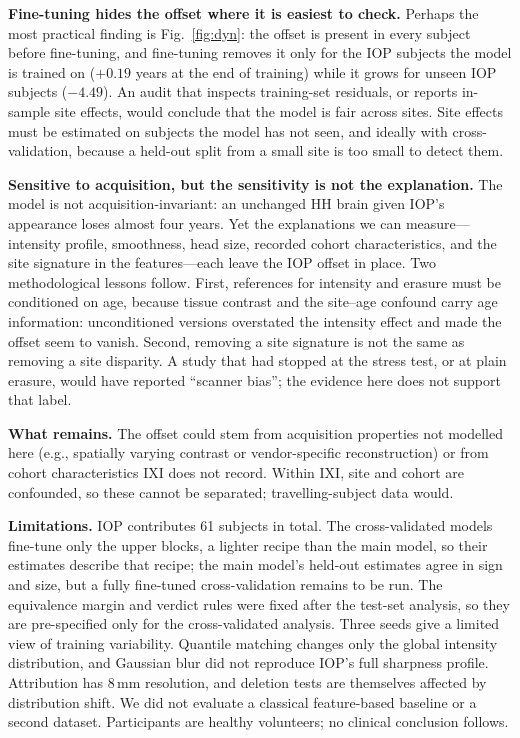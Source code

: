 \documentclass[conference]{IEEEtran}
\begin{document}
\textbf{Fine-tuning hides the offset where it is easiest to check.} Perhaps the most practical finding is Fig.~\ref{fig:dyn}: the offset is present in every subject before fine-tuning, and fine-tuning removes it only for the IOP subjects the model is trained on ($+0.19$ years at the end of training) while it grows for unseen IOP subjects ($-4.49$). An audit that inspects training-set residuals, or reports in-sample site effects, would conclude that the model is fair across sites. Site effects must be estimated on subjects the model has not seen, and ideally with cross-validation, because a held-out split from a small site is too small to detect them.

\textbf{Sensitive to acquisition, but the sensitivity is not the explanation.} The model is not acquisition-invariant: an unchanged HH brain given IOP's appearance loses almost four years. Yet the explanations we can measure---intensity profile, smoothness, head size, recorded cohort characteristics, and the site signature in the features---each leave the IOP offset in place. Two methodological lessons follow. First, references for intensity and erasure must be conditioned on age, because tissue contrast and the site--age confound carry age information: unconditioned versions overstated the intensity effect and made the offset seem to vanish. Second, removing a site signature is not the same as removing a site disparity. A study that had stopped at the stress test, or at plain erasure, would have reported ``scanner bias''; the evidence here does not support that label.

\textbf{What remains.} The offset could stem from acquisition properties not modelled here (e.g., spatially varying contrast or vendor-specific reconstruction) or from cohort characteristics IXI does not record. Within IXI, site and cohort are confounded, so these cannot be separated; travelling-subject data would.

\textbf{Limitations.} IOP contributes 61 subjects in total. The cross-validated models fine-tune only the upper blocks, a lighter recipe than the main model, so their estimates describe that recipe; the main model's held-out estimates agree in sign and size, but a fully fine-tuned cross-validation remains to be run. The equivalence margin and verdict rules were fixed after the test-set analysis, so they are pre-specified only for the cross-validated analysis. Three seeds give a limited view of training variability. Quantile matching changes only the global intensity distribution, and Gaussian blur did not reproduce IOP's full sharpness profile. Attribution has 8\,mm resolution, and deletion tests are themselves affected by distribution shift. We did not evaluate a classical feature-based baseline or a second dataset. Participants are healthy volunteers; no clinical conclusion follows.
\end{document}
